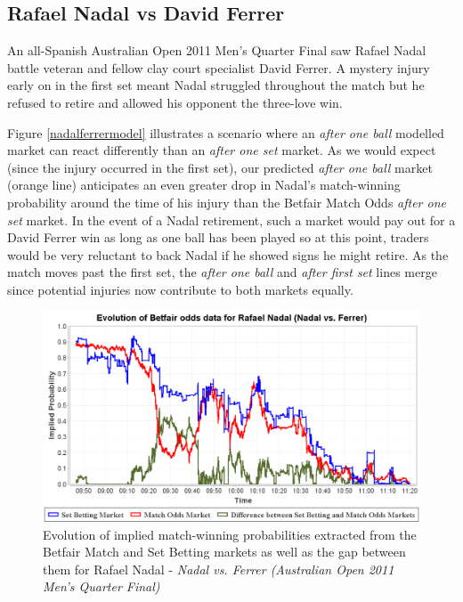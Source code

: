 \documentclass[authoryear, 12pt]{elsarticle}
\begin{document}
\subsection{Rafael Nadal vs David Ferrer}

An all-Spanish Australian Open 2011 Men's Quarter Final saw Rafael Nadal battle veteran and fellow clay court specialist David Ferrer.  A mystery injury early on in the first set meant Nadal struggled throughout the match but he refused to retire and allowed his opponent the three-love win.

Figure \ref{nadalferrermodel} illustrates a scenario where an \textit{after one ball} modelled market can react differently than an \textit{after one set} market.  As we would expect (since the injury occurred in the first set), our predicted \textit{after one ball} market (orange line) anticipates an even greater drop in Nadal's match-winning probability around the time of his injury than the Betfair Match Odds \textit{after one set} market.  In the event of a Nadal retirement, such a market would pay out for a David Ferrer win as long as one ball has been played so at this point, traders would be very reluctant to back Nadal if he showed signs he might retire.  As the match moves past the first set, the \textit{after one ball} and \textit{after first set} lines merge since potential injuries now contribute to both markets equally.

\begin{figure}[H]
  \centering \includegraphics[width=12.3cm]{matches/nadalferrer}
  \caption{Evolution of implied match-winning probabilities extracted from the Betfair Match and Set Betting markets as well as the gap between them for Rafael Nadal - \textit{Nadal vs. Ferrer (Australian Open 2011 Men's Quarter Final)}}
  \label{nadalferrer}
\end{figure}
\end{document}
